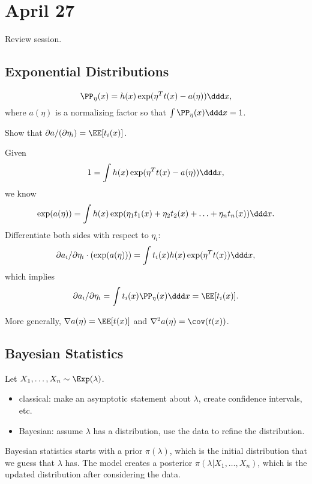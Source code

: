 \section{April 27}

Review session. 

\subsection{Exponential Distributions}

\[\PP_{\eta}(x) = h(x)\exp(\eta^Tt(x) - a(\eta))\ddd x,\]
where $a(\eta)$ is a normalizing factor so that $\int \PP_{\eta}(x)\ddd x = 1$.

\begin{example}
\exlabel

Show that $\partial a/ (\partial \eta_i) = \EE[t_i(x)]$. 
\end{example}
Given 
\[1 = \int h(x) \exp(\eta^Tt(x) - a(\eta))\ddd x,\]
we know 
\[\exp(a(\eta)) = \int h(x) \exp(\eta_1t_1(x) + \eta_2t_2(x) + \hdots + \eta_nt_n(x))\ddd x.\]
Differentiate both sides with respect to $\eta_i$:
\[\partial a_i/\partial \eta_i\cdot (\exp(a(\eta))) = \int t_i(x)h(x)\exp(\eta^Tt(x))\ddd x,\]
which implies 
\[\partial a_i/\partial \eta_i= \int t_i(x) \PP_{\eta}(x)\ddd x = \EE[t_i(x)].\]

\begin{theorem}
\thmlabel

More generally, $\nabla a(\eta) = \EE[t(x)]$ and $\nabla^2 a(\eta) = \cov(t(x))$.
\end{theorem}

\subsection{Bayesian Statistics}

Let $X_1, \hdots, X_n\sim \Exp(\lambda)$.

\begin{itemize}
    \item classical: make an asymptotic statement about $\lambda$, create confidence intervals, etc.
    \item Bayesian: assume $\lambda$ has a distribution, use the data to refine the distribution.
\end{itemize}

Bayesian statistics starts with a \ac{prior} $\pi(\lambda)$, which is the initial distribution that we guess that $\lambda$ has. The model creates a \ac{posterior} $\pi(\lambda|X_1, \hdots, X_n)$, which is the updated distribution after considering the data. 

